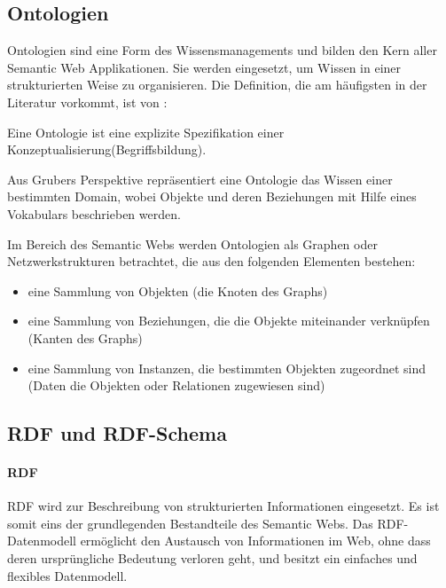 \subsection{Ontologien}

Ontologien sind eine Form des Wissensmanagements und bilden den Kern aller Semantic Web Applikationen. 
Sie werden eingesetzt, um Wissen in einer strukturierten Weise zu organisieren.
Die Definition, die am häufigsten in der Literatur vorkommt, ist von \citet{gruber_translation_1993}:

\begin{definition}
  Eine Ontologie ist eine explizite Spezifikation einer Konzeptualisierung(Begriffsbildung).
\end{definition}

\noindent Aus Grubers Perspektive repräsentiert eine Ontologie das Wissen einer bestimmten Domain, wobei Objekte und deren Beziehungen mit Hilfe eines Vokabulars beschrieben werden. \citep[vgl.]{breitman_semantic_2007}

Im Bereich des Semantic Webs werden Ontologien als Graphen oder Netzwerkstrukturen betrachtet, die aus den folgenden Elementen bestehen:

\begin{itemize}
	\item eine Sammlung von Objekten (die Knoten des Graphs)
	\item eine Sammlung von Beziehungen, die die Objekte miteinander verknüpfen (Kanten des Graphs)
	\item eine Sammlung von Instanzen, die bestimmten Objekten zugeordnet sind (Daten die Objekten oder Relationen zugewiesen sind) \citep[vgl.]{davies_semantic_2006}
\end{itemize}

\subsection{RDF und RDF-Schema} 

\paragraph{RDF}

\ac{RDF} wird zur Beschreibung von strukturierten Informationen eingesetzt. 
Es ist somit eins der grundlegenden Bestandteile des Semantic Webs.
Das \ac{RDF}-Datenmodell ermöglicht den Austausch von Informationen im Web, ohne dass deren ursprüngliche Bedeutung verloren geht, und besitzt ein einfaches und flexibles Datenmodell. \citep[vgl.]{linkeddatavisualization}

